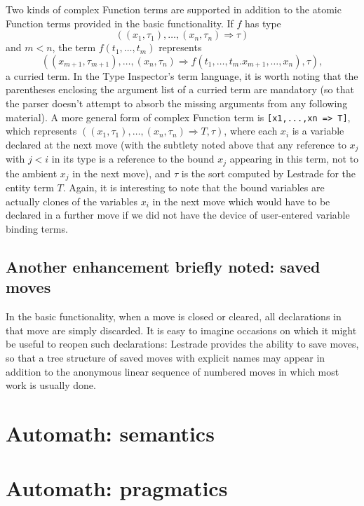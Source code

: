 \documentclass{article}
\begin{document}
Two kinds of complex Function terms are supported in addition to the atomic Function terms provided in the basic functionality.  If $f$ has
type $$((x_1,\tau_1),\ldots,(x_n,\tau_n) \Rightarrow \tau)$$ and $m<n$, the term $f(t_1,\ldots,t_m)$ represents
$$((x_{m+1},\tau_{m+1}),\ldots,(x_n,\tau_n) \Rightarrow f(t_1,\ldots,t_m.x_{m+1},\ldots,x_n),\tau),$$ a curried term.  In the Type Inspector's term language, it is worth noting that the parentheses enclosing the argument list of a curried term are mandatory (so that the parser doesn't attempt to absorb the missing arguments from any following material).  A more general form of complex Function term is {\tt [x1,...,xn => T]}, which represents
$((x_1,\tau_1),\ldots,(x_n,\tau_n) \Rightarrow T,\tau)$, where each $x_i$ is a variable declared at the next move (with the subtlety noted above that
any reference to $x_j$ with $j<i$ in its type is a reference to the bound $x_j$ appearing in this term, not to the ambient $x_j$ in the next move), and $\tau$ is the sort computed by Lestrade for the entity term $T$.  Again, it is interesting to note that the bound variables are actually clones of the variables $x_i$ in the next move which would have to be declared in a further move if we did not have the device of user-entered variable binding terms.

\subsection{Another enhancement briefly noted:  saved moves}

In the basic functionality, when a move is closed or cleared, all declarations in that move are simply discarded.  It is easy to imagine occasions on which it might be useful to reopen such declarations:  Lestrade provides the ability to save moves, so that a tree structure of saved moves with explicit names may appear in addition to the anonymous linear sequence of numbered moves in which most work is usually done.  

\newpage


\section{Automath:  semantics}


\section{Automath:  pragmatics}
\end{document}
